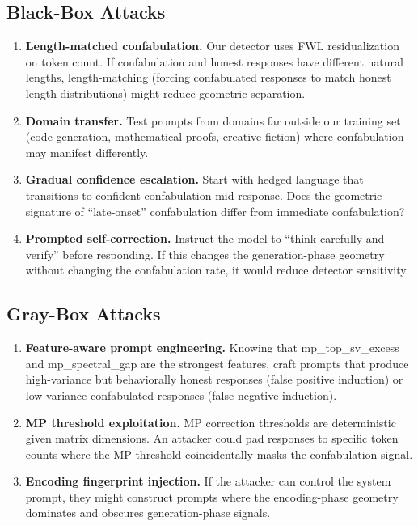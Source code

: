 \documentclass[11pt,letterpaper]{article}
\begin{document}
\subsection{Black-Box Attacks}

\begin{enumerate}[leftmargin=*,label=\textbf{B\arabic*.}]
  \item \textbf{Length-matched confabulation.} Our detector uses
    FWL residualization on token count. If confabulation and honest
    responses have different natural lengths, length-matching (forcing
    confabulated responses to match honest length distributions) might
    reduce geometric separation.

  \item \textbf{Domain transfer.} Test prompts from domains far
    outside our training set (code generation, mathematical proofs,
    creative fiction) where confabulation may manifest differently.

  \item \textbf{Gradual confidence escalation.} Start with hedged
    language that transitions to confident confabulation mid-response.
    Does the geometric signature of ``late-onset'' confabulation
    differ from immediate confabulation?

  \item \textbf{Prompted self-correction.} Instruct the model to
    ``think carefully and verify'' before responding. If this changes
    the generation-phase geometry without changing the confabulation
    rate, it would reduce detector sensitivity.
\end{enumerate}

\subsection{Gray-Box Attacks}

\begin{enumerate}[leftmargin=*,label=\textbf{G\arabic*.}]
  \item \textbf{Feature-aware prompt engineering.} Knowing that
    mp\_top\_sv\_excess and mp\_spectral\_gap are the strongest
    features, craft prompts that produce high-variance but
    behaviorally honest responses (false positive induction) or
    low-variance confabulated responses (false negative induction).

  \item \textbf{MP threshold exploitation.} MP correction thresholds
    are deterministic given matrix dimensions. An attacker could
    pad responses to specific token counts where the MP threshold
    coincidentally masks the confabulation signal.

  \item \textbf{Encoding fingerprint injection.} If the attacker can
    control the system prompt, they might construct prompts where
    the encoding-phase geometry dominates and obscures
    generation-phase signals.
\end{enumerate}
\end{document}
